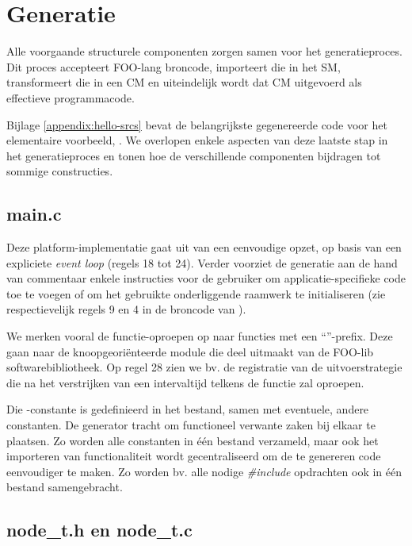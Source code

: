 
\section{Generatie}
\label{section:generation}

Alle voorgaande structurele componenten zorgen samen voor het generatieproces.
Dit proces accepteert FOO-lang broncode, importeert die in het SM,
transformeert die in een CM en uiteindelijk wordt dat CM uitgevoerd als
effectieve programmacode.

Bijlage \ref{appendix:hello-srcs} bevat de belangrijkste gegenereerde code voor
het elementaire voorbeeld, . We overlopen enkele aspecten van
deze laatste stap in het generatieproces en tonen hoe de verschillende
componenten bijdragen tot sommige constructies.

\subsection{main.c}

Deze platform-implementatie gaat uit van een eenvoudige opzet, op basis van een
expliciete \emph{event loop} (regels 18 tot 24). Verder voorziet de generatie
aan de hand van commentaar enkele instructies voor de gebruiker om
applicatie-specifieke code toe te voegen of om het gebruikte onderliggende
raamwerk te initialiseren (zie respectievelijk regels 9 en 4 in de broncode van
).

We merken vooral de functie-oproepen op naar functies met een
``''-prefix. Deze gaan naar de  knoopgeori\"enteerde
module die deel uitmaakt van de FOO-lib softwarebibliotheek. Op regel 28 zien
we bv. de registratie van de uitvoerstrategie die na het verstrijken van een
intervaltijd telkens de functie  zal oproepen.

Die -constante is gedefinieerd in het  bestand,
samen met eventuele, andere constanten. De generator tracht om functioneel
verwante zaken bij elkaar te plaatsen. Zo worden alle constanten in \'e\'en
bestand verzameld, maar ook het importeren van functionaliteit wordt
gecentraliseerd om de te genereren code eenvoudiger te maken. Zo worden bv.
alle nodige \emph{\#include} opdrachten ook in \'e\'en  bestand
samengebracht.

\subsection{node\_t.h en node\_t.c}

